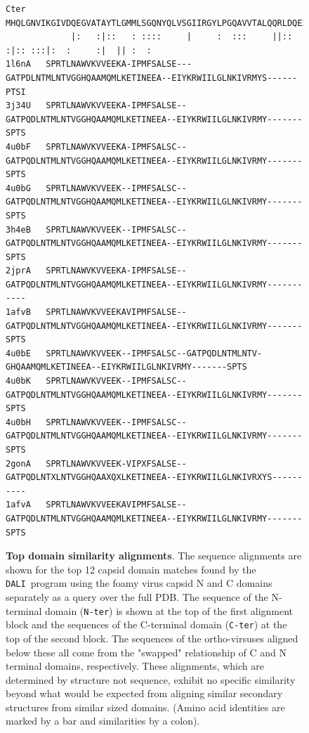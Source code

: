 \documentclass[12pt]{article}
\newcommand{\3}{$3_{10}$}
\newcommand{\DALI}{{\tt DALI}}
\begin{document}
\begin{figure}
\begin{singlespace}
\begin{tiny}
\begin{Verbatim}[frame=single]
Cter    MHQLGNVIKGIVDQEGVATAYTLGMMLSGQNYQLVSGIIRGYLPGQAVVTALQQRLDQEIDNQTRAETFIQHLNAVYEILGLNARGQSIRL
             |:   :|::   : ::::     |     :  :::     ||:: :|:: :::|:  :     :|  || :  :    
1l6nA   SPRTLNAWVKVVEEKA-IPMFSALSE---GATPDLNTMLNTVGGHQAAMQMLKETINEEA--EIYKRWIILGLNKIVRMYS------PTSI
3j34U   SPRTLNAWVKVVEEKA-IPMFSALSE--GATPQDLNTMLNTVGGHQAAMQMLKETINEEA--EIYKRWIILGLNKIVRMY-------SPTS
4u0bF   SPRTLNAWVKVVEEKA-IPMFSALSC--GATPQDLNTMLNTVGGHQAAMQMLKETINEEA--EIYKRWIILGLNKIVRMY-------SPTS
4u0bG   SPRTLNAWVKVVEEK--IPMFSALSC--GATPQDLNTMLNTVGGHQAAMQMLKETINEEA--EIYKRWIILGLNKIVRMY-------SPTS
3h4eB   SPRTLNAWVKVVEEK--IPMFSALSC--GATPQDLNTMLNTVGGHQAAMQMLKETINEEA--EIYKRWIILGLNKIVRMY-------SPTS
2jprA   SPRTLNAWVKVVEEKA-IPMFSALSE--GATPQDLNTMLNTVGGHQAAMQMLKETINEEA--EIYKRWIILGLNKIVRMY-----------
1afvB   SPRTLNAWVKVVEEKAVIPMFSALSE--GATPQDLNTMLNTVGGHQAAMQMLKETINEEA--EIYKRWIILGLNKIVRMY-------SPTS
4u0bE   SPRTLNAWVKVVEEK--IPMFSALSC--GATPQDLNTMLNTV-GHQAAMQMLKETINEEA--EIYKRWIILGLNKIVRMY-------SPTS
4u0bK   SPRTLNAWVKVVEEK--IPMFSALSC--GATPQDLNTMLNTVGGHQAAMQMLKETINEEA--EIYKRWIILGLNKIVRMY-------SPTS
4u0bH   SPRTLNAWVKVVEEK--IPMFSALSC--GATPQDLNTMLNTVGGHQAAMQMLKETINEEA--EIYKRWIILGLNKIVRMY-------SPTS
2gonA   SPRTLNAWVKVVEEK-VIPXFSALSE--GATPQDLNTXLNTVGGHQAAXQXLKETINEEA--EIYKRWIILGLNKIVRXYS----------
1afvA   SPRTLNAWVKVVEEKAVIPMFSALSE--GATPQDLNTMLNTVGGHQAAMQMLKETINEEA--EIYKRWIILGLNKIVRMY-------SPTS
\end{Verbatim}
\end{tiny}
\end{singlespace}
\begin{footnotesize}
\caption{
\label{Fig:swap}
{\bf Top domain similarity alignments}.
The sequence alignments are shown for the top 12 capsid domain matches found by the \DALI\ program 
using the foamy virus capsid N and C domains separately as a query over the full PDB.
The sequence of the N-terminal domain ({\tt N-ter}) is shown at the top of the first alignment block and the
sequences of the C-terminal domain ({\tt C-ter}) at the top of the second block.   The sequences of the
ortho-virsuses aligned below these all come from the "swapped" relationship of C and N terminal domains,
respectively.   These alignments, which are determined by structure not sequence, exhibit no
specific similarity beyond what would be expected from aligning similar secondary structures from
similar sized domains. (Amino acid identities are marked by a bar and similarities by a colon).
}
\end{footnotesize}
\end{figure}
\end{document}
